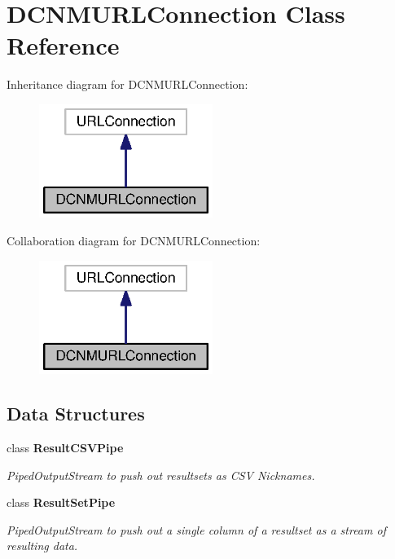 \section{D\+C\+N\+M\+U\+R\+L\+Connection Class Reference}
\label{classorg_1_1smallfoot_1_1parser_1_1dcnmsql_1_1DCNMURLConnection}


Inheritance diagram for D\+C\+N\+M\+U\+R\+L\+Connection\+:\nopagebreak
\begin{figure}[H]
\begin{center}
\leavevmode
\includegraphics[width=160pt]{classorg_1_1smallfoot_1_1parser_1_1dcnmsql_1_1DCNMURLConnection__inherit__graph}
\end{center}
\end{figure}


Collaboration diagram for D\+C\+N\+M\+U\+R\+L\+Connection\+:\nopagebreak
\begin{figure}[H]
\begin{center}
\leavevmode
\includegraphics[width=160pt]{classorg_1_1smallfoot_1_1parser_1_1dcnmsql_1_1DCNMURLConnection__coll__graph}
\end{center}
\end{figure}
\subsection*{Data Structures}
\begin{DoxyCompactItemize}
\item 
class {\bfseries Result\+C\+S\+V\+Pipe}
\begin{DoxyCompactList}\small\item\em Piped\+Output\+Stream to push out resultsets as C\+S\+V Nicknames. \end{DoxyCompactList}\item 
class {\bfseries Result\+Set\+Pipe}
\begin{DoxyCompactList}\small\item\em Piped\+Output\+Stream to push out a single column of a resultset as a stream of resulting data. \end{DoxyCompactList}\end{DoxyCompactItemize}
